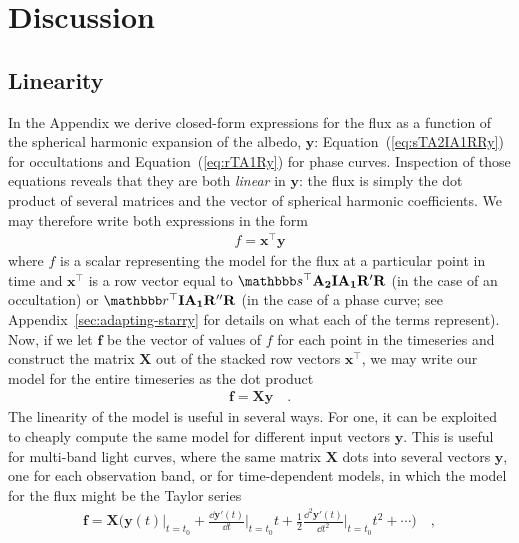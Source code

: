 \documentclass[modern]{aastex62}
\begin{document}
\section{Discussion}
\label{sec:discussion}

\subsection{Linearity}
\label{sec:linearity}

In the Appendix we derive closed-form expressions for the flux
as a function of the spherical harmonic expansion of the albedo,
$\mathbf{y}$: Equation~(\ref{eq:sTA2IA1RRy}) for occultations and
Equation~(\ref{eq:rTA1Ry}) for phase curves. Inspection of those
equations reveals that they are both \emph{linear} in $\mathbf{y}$:
the flux is simply the dot product of several matrices and the
vector of spherical harmonic coefficients. We may therefore write
both expressions in the form
%
\begin{align}
    f = \mathbf{x}^\top \mathbf{y}
\end{align}
%
where $f$ is a scalar representing the model for the flux at a particular
point in time and $\mathbf{x}^\top$ is a row vector equal to
$\sT\mathbf{A_2}\mathbf{I}\mathbf{A_1}\mathbf{R'}\mathbf{R}$
(in the case of an occultation)
or
$\rT\mathbf{I}\mathbf{A_1}\mathbf{R''}\mathbf{R}$
(in the case of a phase curve; see Appendix~\ref{sec:adapting-starry}
for details on what each of the terms represent). Now, if we let $\mathbf{f}$
be the vector of values of $f$ for each point in the timeseries and
construct the matrix $\mathbf{X}$ out of the stacked row vectors
$\mathbf{x}^\top$, we may write our model for the entire timeseries as
the dot product
%
\begin{align}
    \mathbf{f} = \mathbf{X} \mathbf{y}
    \quad.
\end{align}
%
The linearity of the \starry model is useful in several ways. For one,
it can be exploited to cheaply compute the same model for different
input vectors $\mathbf{y}$. This is useful for multi-band light curves,
where the same matrix $\mathbf{X}$ dots into several vectors $\mathbf{y}$,
one for each observation band, or for time-dependent models, in which
the model for the flux might be the Taylor series
%
\begin{align}
    \mathbf{f} =
    \mathbf{X}
    \bigg(
    \mathbf{y}(t)\bigg|_{t=t_0} +
    \frac{\dd\mathbf{y'}(t)}{\dd t}\bigg|_{t=t_0} t +
    \frac{1}{2}\frac{\dd^2\mathbf{y'}(t)}{\dd t^2}\bigg|_{t=t_0} t^2 +
    \cdots
    \bigg)
    \quad,
\end{align}
\end{document}
